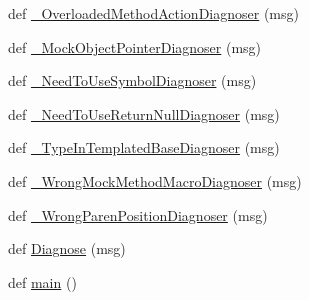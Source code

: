 \begin{DoxyCompactItemize}
\item 
def \mbox{\hyperlink{namespacegoogletest-master_1_1googlemock_1_1scripts_1_1gmock__doctor_a04c83a4005c616699e927a2f7be479ee}{\+\_\+\+Overloaded\+Method\+Action\+Diagnoser}} (msg)
\item 
def \mbox{\hyperlink{namespacegoogletest-master_1_1googlemock_1_1scripts_1_1gmock__doctor_a471a02832014a22835f67a46042ed705}{\+\_\+\+Mock\+Object\+Pointer\+Diagnoser}} (msg)
\item 
def \mbox{\hyperlink{namespacegoogletest-master_1_1googlemock_1_1scripts_1_1gmock__doctor_a514d14627a866affd9397359b526cbb5}{\+\_\+\+Need\+To\+Use\+Symbol\+Diagnoser}} (msg)
\item 
def \mbox{\hyperlink{namespacegoogletest-master_1_1googlemock_1_1scripts_1_1gmock__doctor_a283d727e80bb015be768c484befbaa9f}{\+\_\+\+Need\+To\+Use\+Return\+Null\+Diagnoser}} (msg)
\item 
def \mbox{\hyperlink{namespacegoogletest-master_1_1googlemock_1_1scripts_1_1gmock__doctor_ae566a8c270c63f6caf9c038371401251}{\+\_\+\+Type\+In\+Templated\+Base\+Diagnoser}} (msg)
\item 
def \mbox{\hyperlink{namespacegoogletest-master_1_1googlemock_1_1scripts_1_1gmock__doctor_af88df928c04b102a80ca5d670865f06c}{\+\_\+\+Wrong\+Mock\+Method\+Macro\+Diagnoser}} (msg)
\item 
def \mbox{\hyperlink{namespacegoogletest-master_1_1googlemock_1_1scripts_1_1gmock__doctor_a03e2896d488ee2109088446d8e74653c}{\+\_\+\+Wrong\+Paren\+Position\+Diagnoser}} (msg)
\item 
def \mbox{\hyperlink{namespacegoogletest-master_1_1googlemock_1_1scripts_1_1gmock__doctor_abbaae28b08ad22a25b012e438ae92f75}{Diagnose}} (msg)
\item 
def \mbox{\hyperlink{namespacegoogletest-master_1_1googlemock_1_1scripts_1_1gmock__doctor_a969fac0e0ab9ba8ad46340aa1dbad360}{main}} ()
\end{DoxyCompactItemize}
